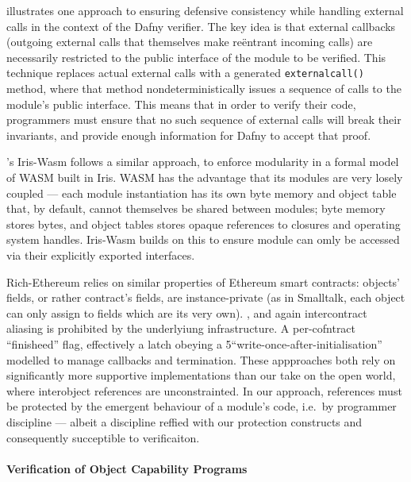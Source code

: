 \citet{CassezFQ24} illustrates one approach to ensuring defensive
consistency while handling external calls in the context of the Dafny
verifier. The key idea is that external callbacks (outgoing external
calls that themselves make re{\"e}ntrant incoming calls) are
necessarily restricted to the public interface of the module to be
verified.  This technique replaces actual external calls with a
generated \texttt{externalcall()} method, where that method
nondeterministically issues a sequence of calls to the module's public
interface.  This means that in order to verify their code, programmers
must ensure that no such sequence of external calls will break their
invariants, and provide enough information for Dafny to accept that
proof.

\citet{iris-wasm-pldi2023}'s Iris-Wasm follows a similar approach,
to enforce 
modularity in a formal model of WASM built in Iris.  WASM has the
advantage that its modules are very losely coupled --- each module
instantiation has its own byte memory and object table that, by default,
cannot themselves be shared between modules; byte memory stores bytes,
and object tables stores opaque references to closures and operating
system handles. Iris-Wasm builds on this to ensure module can omly be
accessed via their explicitly exported interfaces.

Rich-Ethereum \cite{rich-specs-smart-contracts-oopsla2021} relies on similar
properties of Ethereum smart contracts: objects' fields,
or rather contract's fields, 
are instance-private (as in Smalltalk, each object can only
assign to fields which are its very own).  , and again intercontract aliasing is prohibited
by the underlyiung infrastructure.  A per-cofntract ``finisheed''
flag, effectively a latch obeying a
5``write-once-after-initialisation'' modelled to manage callbacks and
termination.  These appproaches both rely on significantly more
supportive implementations than our take on the open world, where
interobject references are unconstrainted.
In our approach, references must be protected by the emergent
behaviour of a module's code, i.e.\  by programmer discipline ---
albeit a discipline reffied with our protection constructs and
consequently succeptible to verificaiton.






\paragraph{Verification of Object Capability Programs}


